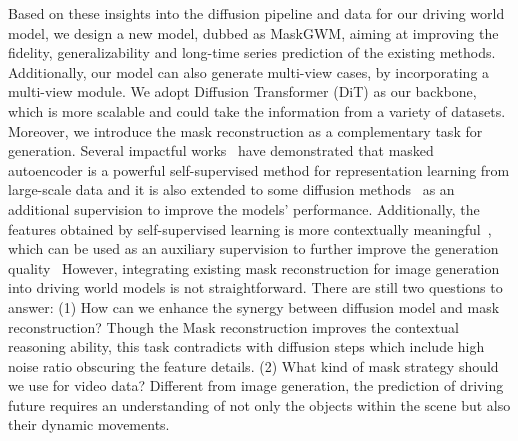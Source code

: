 Based on these insights into the diffusion pipeline and data for our driving world model, we design a new model, dubbed as MaskGWM, aiming at improving the fidelity, generalizability and long-time series prediction of the existing methods. Additionally, our model can also generate multi-view cases, by incorporating a multi-view module. We adopt Diffusion Transformer (DiT) as our backbone, which is more scalable and could take the information from a variety of datasets.
Moreover, we introduce the mask reconstruction as a complementary task for generation.
Several impactful works~\cite{mae,simmim} have demonstrated that masked autoencoder is a powerful self-supervised method for representation learning from large-scale data and it is also extended to some diffusion methods~\cite{maskdit,sd_dit,mdt} as an additional supervision to improve the models' performance. 
Additionally, the features obtained by self-supervised learning is more contextually meaningful~\cite{dino}, which can be used as an auxiliary supervision to further improve the generation quality~\cite{gaia1} 
However, integrating existing mask reconstruction for image generation into driving world models is not straightforward. There are still two questions to answer: (1) How can we enhance the synergy between diffusion model and mask reconstruction? Though the Mask reconstruction improves the contextual reasoning ability, this task contradicts with diffusion steps which include high noise ratio obscuring the feature details. (2) What kind of mask strategy should we use for video data? Different from image generation, the prediction of driving future requires an understanding of not only the objects within the scene but also their dynamic movements.






